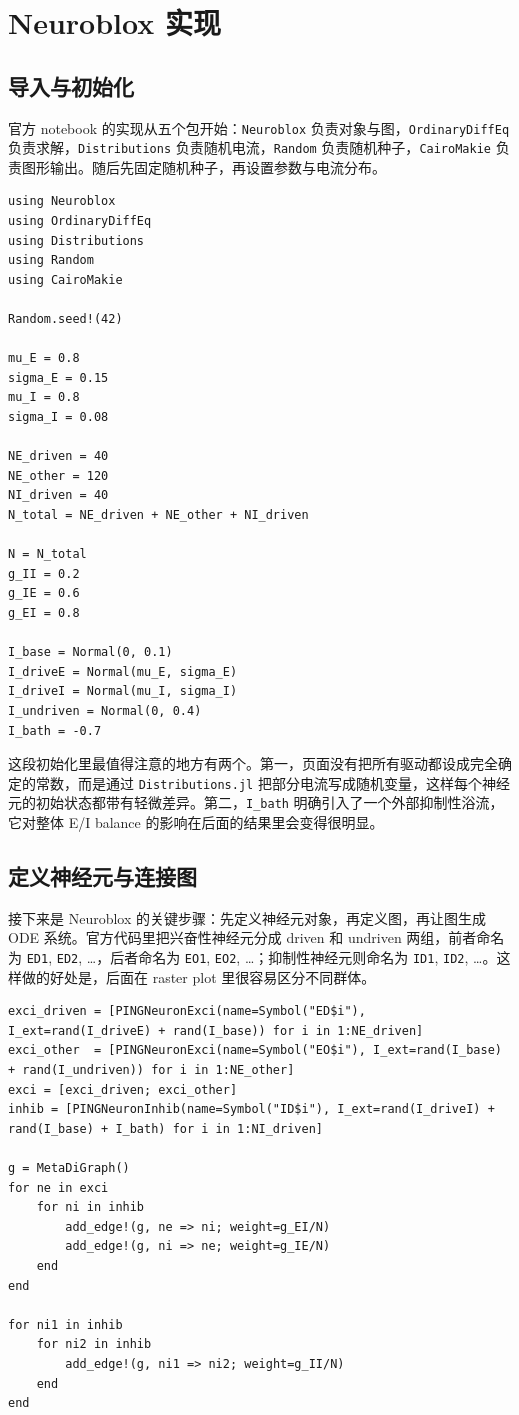 \documentclass[a4paper]{article}
\begin{document}
\section{Neuroblox 实现}
\subsection{导入与初始化}
官方 notebook 的实现从五个包开始：\texttt{Neuroblox} 负责对象与图，\texttt{OrdinaryDiffEq} 负责求解，\texttt{Distributions} 负责随机电流，\texttt{Random} 负责随机种子，\texttt{CairoMakie} 负责图形输出。随后先固定随机种子，再设置参数与电流分布。

\begin{lstlisting}[caption={导入依赖、固定随机种子并设置参数},label={lst:ping_init}]
using Neuroblox
using OrdinaryDiffEq
using Distributions
using Random
using CairoMakie

Random.seed!(42)

mu_E = 0.8
sigma_E = 0.15
mu_I = 0.8
sigma_I = 0.08

NE_driven = 40
NE_other = 120
NI_driven = 40
N_total = NE_driven + NE_other + NI_driven

N = N_total
g_II = 0.2
g_IE = 0.6
g_EI = 0.8

I_base = Normal(0, 0.1)
I_driveE = Normal(mu_E, sigma_E)
I_driveI = Normal(mu_I, sigma_I)
I_undriven = Normal(0, 0.4)
I_bath = -0.7
\end{lstlisting}

这段初始化里最值得注意的地方有两个。第一，页面没有把所有驱动都设成完全确定的常数，而是通过 \texttt{Distributions.jl} 把部分电流写成随机变量，这样每个神经元的初始状态都带有轻微差异。第二，\texttt{I\_bath} 明确引入了一个外部抑制性浴流，它对整体 E/I balance 的影响在后面的结果里会变得很明显。

\subsection{定义神经元与连接图}
接下来是 Neuroblox 的关键步骤：先定义神经元对象，再定义图，再让图生成 ODE 系统。官方代码里把兴奋性神经元分成 driven 和 undriven 两组，前者命名为 \texttt{ED1}, \texttt{ED2}, \dots，后者命名为 \texttt{EO1}, \texttt{EO2}, \dots；抑制性神经元则命名为 \texttt{ID1}, \texttt{ID2}, \dots。这样做的好处是，后面在 raster plot 里很容易区分不同群体。

\begin{lstlisting}[caption={定义神经元并写出图连接的基本形式},label={lst:ping_graph}]
exci_driven = [PINGNeuronExci(name=Symbol("ED$i"), I_ext=rand(I_driveE) + rand(I_base)) for i in 1:NE_driven]
exci_other  = [PINGNeuronExci(name=Symbol("EO$i"), I_ext=rand(I_base) + rand(I_undriven)) for i in 1:NE_other]
exci = [exci_driven; exci_other]
inhib = [PINGNeuronInhib(name=Symbol("ID$i"), I_ext=rand(I_driveI) + rand(I_base) + I_bath) for i in 1:NI_driven]

g = MetaDiGraph()
for ne in exci
    for ni in inhib
        add_edge!(g, ne => ni; weight=g_EI/N)
        add_edge!(g, ni => ne; weight=g_IE/N)
    end
end

for ni1 in inhib
    for ni2 in inhib
        add_edge!(g, ni1 => ni2; weight=g_II/N)
    end
end
\end{lstlisting}
\end{document}
